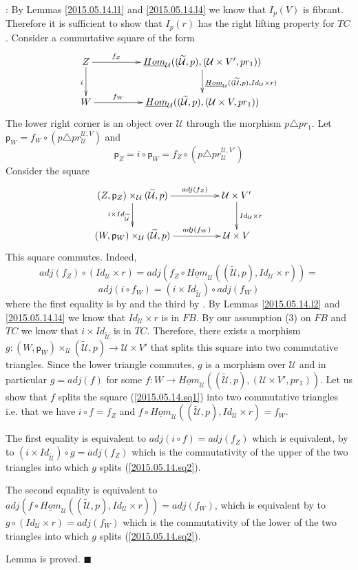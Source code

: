 \documentclass[12pt]{article}
\numberwithin{equation}{section}
\newenvironment{eq}{\begin{equation}}{\end{equation}}
\newenvironment{myproof}{{\bf Proof}:}{$\blacksquare$ \vskip 5mm }
\newcommand{\llabel}[1]{\label{#1}}
\newcommand{\sr}{\rightarrow}
\newcommand{\uu}{\underline}
\newcommand{\iHom}{\uu{Hom}}
\newcommand{\wt}{\widetilde}
\newcommand{\p}{\mathsf{p}}
\newcommand{\U}{\mathcal{U}}
\begin{document}
\begin{myproof}
By Lemmas \ref{2015.05.14.l1} and \ref{2015.05.14.l4} we know that $I_p(V)$ is
fibrant. Therefore it is sufficient to show that $I_p(r)$ has the right lifting
property for $TC$. Consider a commutative square of the form
%
\begin{eq}
\llabel{2015.05.14.sq1}
\begin{xy}
          \xymatrix@C=4pc{ Z \ar[r]^-{f_Z} \ar[d]_{i} &
            \iHom_\U((\wt{\U},p),(\U\times V',pr_1))
            \ar[d]^{\iHom_\U((\wt{\U},p), Id_\U\times r)}\\ W \ar[r]^-{f_W} &
            \iHom_\U((\wt{\U},p), (\U\times V, pr_1)) }
\end{xy}
\end{eq}
%
The lower right corner is an object over $\U$ through the morphism $p\triangle
pr_1$. Let $\p_W=f_W\circ (p\triangle pr^{\U,V}_\U)$ and
%
$$\p_Z=i\circ \p_W=f_Z\circ (p\triangle pr^{\U,V'}_\U)$$
%
Consider the square
%
\begin{eq}
\llabel{2015.05.14.sq2}
\begin{xy}
          \xymatrix@C=4pc{ (Z,\p_Z)\times_\U (\wt{\U},p) \ar[r]^-{adj(f_Z)}
            \ar[d]_{i\times Id_{\wt{\U}}} & \U\times V' \ar[d]^{Id_\U\times
              r}\\ (W,\p_W)\times_\U (\wt{\U},p) \ar[r]^-{adj(f_W)} & \U\times V }
\end{xy}
\end{eq}
%
This square commutes. Indeed,
%
$$adj(f_Z)\circ (Id_\U\times r )=adj(f_Z\circ \iHom_\U((\wt{\U},p), Id_\U\times
r))=$$
$$adj(i\circ f_W)=(i\times Id_{\wt{\U}})\circ adj (f_W)$$
%
where the first equality is by \cite[Lemma 8.7(1)]{fromunivwithPi} and the
third by \cite[Lemma 8.7(3)]{fromunivwithPi}. By Lemmas \ref{2015.05.14.l2} and
\ref{2015.05.14.l4} we know that $Id_\U\times r$ is in $FB$. By our assumption
(3) on $FB$ and $TC$ we know that $i\times Id_{\wt{\U}}$ is in $TC$. Therefore,
there exists a morphism $g:(W,\p_W)\times_\U (\wt{\U},p) \sr \U\times V'$ that
splits this square into two commutative triangles. Since the lower triangle
commutes, $g$ is a morphism over $\U$ and in particular $g=adj(f)$ for some
$f:W\sr \iHom_\U((\wt{\U},p),(\U\times V',pr_1))$. Let us show that $f$ splits
the square (\ref{2015.05.14.sq1}) into two commutative triangles i.e. that we
have $i\circ f= f_Z$ and $f\circ \iHom_\U((\wt{\U},p), Id_\U\times r)=f_W$.

The first equality is equivalent to $adj(i\circ f)=adj(f_Z)$ which is
equivalent, by \cite[Lemma 8.7(3)]{fromunivwithPi} to $(i\times
Id_{\wt{\U}})\circ g=adj(f_Z)$ which is the commutativity of the upper of the
two triangles into which $g$ splits (\ref{2015.05.14.sq2}).

The second equality is equivalent to $adj(f\circ \iHom_\U((\wt{\U},p),
Id_\U\times r))=adj(f_W)$, which is equivalent by \cite[Lemma
  8.7(1)]{fromunivwithPi} to $g\circ (Id_\U\times r)=adj(f_W)$ which is the
commutativity of the lower of the two triangles into which $g$ splits
(\ref{2015.05.14.sq2}).

Lemma is proved.
\end{myproof}
\end{document}
